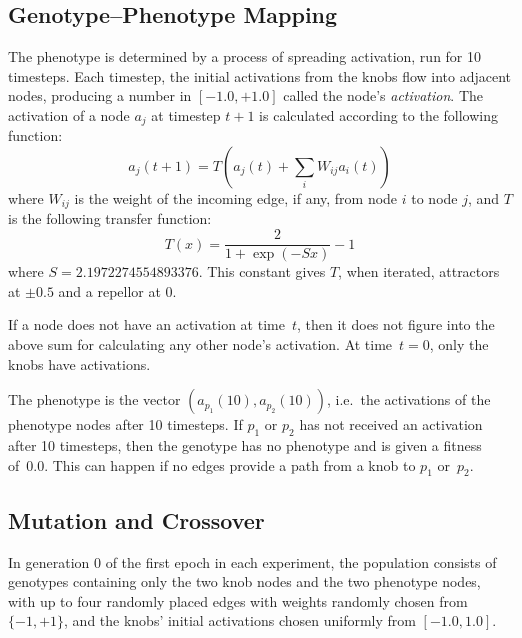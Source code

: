 \documentclass[letterpaper]{article}
\begin{document}
\subsection{Genotype--Phenotype Mapping}

The phenotype is determined by a process of spreading activation, run for
10 timesteps. Each timestep, the initial activations from the knobs flow into
adjacent nodes, producing a number in $[-1.0, +1.0]$ called the node's
\textit{activation}. The activation of a node $a_j$ at timestep $t+1$ is
calculated according to the following function:
\[
   a_j(t+1) = T(a_j(t) + \sum_iW_{ij}a_i(t))
\]
where $W_{ij}$ is the weight of the incoming edge, if any, from node $i$ to
node $j$, and $T$ is the following transfer function:
\[
   T(x) = \frac{2}{1+\exp(-Sx)}-1
\]
where $S=2.1972274554893376$. This constant gives $T$, when iterated,
attractors at $\pm0.5$ and a repellor at 0.

If a node does not have an activation at time~$t$, then it does not figure
into the above sum for calculating any other node's activation. At time~$t=0$,
only the knobs have activations.

The phenotype is the vector $(a_{p_1}(10), a_{p_2}(10))$, i.e.~the activations
of the phenotype nodes after 10 timesteps. If $p_1$ or $p_2$ has not received
an activation after 10 timesteps, then the genotype has no phenotype and is
given a fitness of~0.0. This can happen if no edges provide a path from a knob
to $p_1$ or~$p_2$.

\subsection{Mutation and Crossover}

In generation 0 of the first epoch in each experiment, the population consists
of genotypes containing only the two knob nodes and the two phenotype nodes,
with up to four randomly placed edges with weights randomly chosen from $\{-1,
+1\}$, and the knobs' initial activations chosen uniformly from $[-1.0, 1.0]$.
\end{document}
